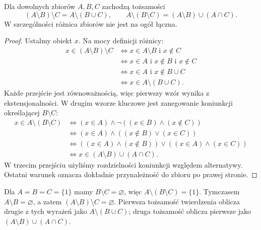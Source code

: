 \begin{twierdzenie}\label{thm:difference-laws-xlii}
Dla dowolnych zbiorów $A,B,C$ zachodzą tożsamości
\[
(A\setminus B)\setminus C=A\setminus(B\cup C),
\qquad
A\setminus(B\setminus C)=(A\setminus B)\cup(A\cap C).
\]
W szczególności różnica zbiorów nie jest na ogół łączna.
\end{twierdzenie}
\begin{proof}
Ustalmy obiekt $x$. Na mocy definicji różnicy:
\begin{align*}
x\in(A\setminus B)\setminus C
&\iff x\in A\setminus B\text{ i }x\notin C\\
&\iff x\in A\text{ i }x\notin B\text{ i }x\notin C\\
&\iff x\in A\text{ i }x\notin B\cup C\\
&\iff x\in A\setminus(B\cup C).
\end{align*}
Każde przejście jest równoważnością, więc pierwszy wzór
wynika z ekstensjonalności. W drugim wzorze kluczowe
jest zanegowanie koniunkcji określającej $B\setminus C$:
\begin{align*}
x\in A\setminus(B\setminus C)
&\iff (x\in A)\land\neg((x\in B)\land(x\notin C))\\
&\iff (x\in A)\land((x\notin B)\lor(x\in C))\\
&\iff ((x\in A)\land(x\notin B))
  \lor((x\in A)\land(x\in C))\\
&\iff x\in(A\setminus B)\cup(A\cap C).
\end{align*}
W trzecim przejściu użyliśmy rozdzielności koniunkcji
względem alternatywy. Ostatni warunek oznacza dokładnie
przynależność do zbioru po prawej stronie.
\end{proof}
\begin{przyklad}\label{ex:difference-parentheses-xlii}
Dla $A=B=C=\{1\}$ mamy $B\setminus C=\varnothing$,
więc $A\setminus(B\setminus C)=\{1\}$.
Tymczasem $A\setminus B=\varnothing$, a zatem
$(A\setminus B)\setminus C=\varnothing$.
Pierwsza tożsamość twierdzenia oblicza drugie z tych wyrażeń
jako $A\setminus(B\cup C)$; druga tożsamość oblicza
pierwsze jako $(A\setminus B)\cup(A\cap C)$.
\end{przyklad}


